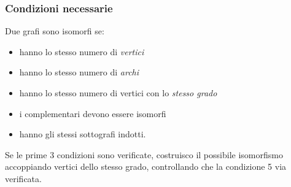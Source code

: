\subsubsection{Condizioni necessarie}
Due grafi sono isomorfi se:
\begin{itemize}
\item hanno lo stesso numero di \emph{vertici}
\item hanno lo stesso numero di \emph{archi}
\item hanno lo stesso numero di vertici con lo \emph{stesso grado}
\item i complementari devono essere isomorfi
\item hanno gli stessi sottografi indotti.
\end{itemize}
Se le prime 3 condizioni sono verificate, costruisco il possibile isomorfismo accoppiando vertici dello
stesso grado, controllando che la condizione 5 via verificata. \\








\newpage
